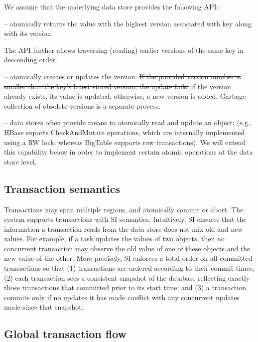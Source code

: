 We assume that the underlying data store provides the following API:
\begin{description}
\item [] -- atomically returns the value with
the highest version associated with key along with its version.
\item The API further allows traversing (reading) earlier versions of the same
key in descending order.
\item [\code{write(key,value,version)}] -- atomically creates or updates the version:
\sout{If the provided version number is smaller than the key's latest stored
version, the update fails.} if the version already exists, its value is updated;
otherwise, a new version is added. Garbage collection of obsolete versions is a separate
process.
\item [Read-modify-write] --  data stores often provide means to atomically read and
update an object; (e.g., HBase exports CheckAndMutate operations, which are 
internally implemented using a RW lock, whereas BigTable supports row transactions). We
will extend this capability below in order to implement certain atomic
operations at the data store level.
\end{description}

\subsection{Transaction semantics} \label{ssec:transactions}

 Transactions may span multiple regions, and atomically commit or abort. The
 system supports transactions with SI semantics. Intuitively, SI ensures that
 the information a transaction reads from the data store does not mix old and
 new values. For example, if a task updates the values of two objects, then no
 concurrent transaction may observe the old value of one of these objects and
 the new value of the other. More precisely, SI enforces a total order on all
 committed transactions so that (1) transactions are ordered according to their
 commit times, (2) each transaction sees a consistent snapshot of the database
 reflecting exactly those transactions that committed prior to its start time;
 and (3) a transaction commits only if no updates it has made conflict with any
 concurrent updates made since that snapshot.

\subsection{Global transaction flow} \label{ssec:global-transactions}


